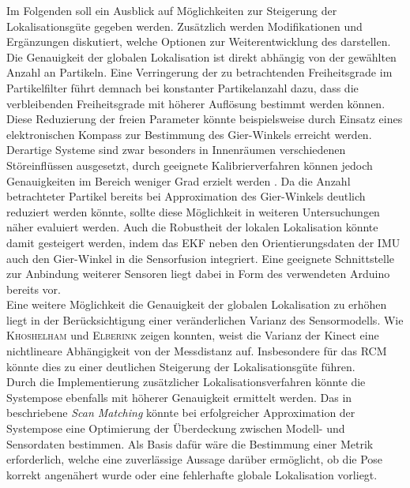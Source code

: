 Im Folgenden soll ein Ausblick auf Möglichkeiten zur Steigerung der Lokalisationsgüte gegeben werden. Zusätzlich werden Modifikationen und Ergänzungen diskutiert, welche Optionen zur Weiterentwicklung des  darstellen.\\

Die Genauigkeit der globalen Lokalisation ist direkt abhängig von der gewählten Anzahl an Partikeln. Eine Verringerung der zu betrachtenden Freiheitsgrade im Partikelfilter führt demnach bei konstanter Partikelanzahl dazu, dass die verbleibenden Freiheitsgrade mit höherer Auflösung bestimmt werden können. Diese Reduzierung der freien Parameter könnte beispielsweise durch Einsatz eines elektronischen Kompass zur Bestimmung des Gier-Winkels erreicht werden. Derartige Systeme sind zwar besonders in Innenräumen verschiedenen Störeinflüssen ausgesetzt, durch geeignete Kalibrierverfahren können jedoch Genauigkeiten im Bereich weniger Grad erzielt werden \cite{Li2011}. Da die Anzahl betrachteter Partikel bereits bei Approximation des Gier-Winkels deutlich reduziert werden könnte, sollte diese Möglichkeit in weiteren Untersuchungen näher evaluiert werden. Auch die Robustheit der lokalen Lokalisation könnte damit gesteigert werden, indem das EKF neben den Orientierungsdaten der IMU auch den Gier-Winkel in die Sensorfusion integriert. Eine geeignete Schnittstelle zur Anbindung weiterer Sensoren liegt dabei in Form des verwendeten Arduino bereits vor.\\

Eine weitere Möglichkeit die Genauigkeit der globalen Lokalisation zu erhöhen liegt in der Berücksichtigung einer veränderlichen Varianz des Sensormodells. Wie \textsc{Khoshelham} und \textsc{Elberink} \cite{Khoshelham2012} zeigen konnten, weist die Varianz der Kinect eine nichtlineare Abhängigkeit von der Messdistanz auf. Insbesondere für das RCM könnte dies zu einer deutlichen Steigerung der Lokalisationsgüte führen.\\

Durch die Implementierung zusätzlicher Lokalisationsverfahren könnte die Systempose ebenfalls mit höherer Genauigkeit ermittelt werden. Das in  beschriebene \textit{Scan Matching} könnte bei erfolgreicher Approximation der Systempose eine Optimierung der Überdeckung zwischen Modell- und Sensordaten bestimmen. Als Basis dafür wäre die Bestimmung einer Metrik erforderlich, welche eine zuverlässige Aussage darüber ermöglicht, ob die Pose korrekt angenähert wurde oder eine fehlerhafte globale Lokalisation vorliegt.\\

